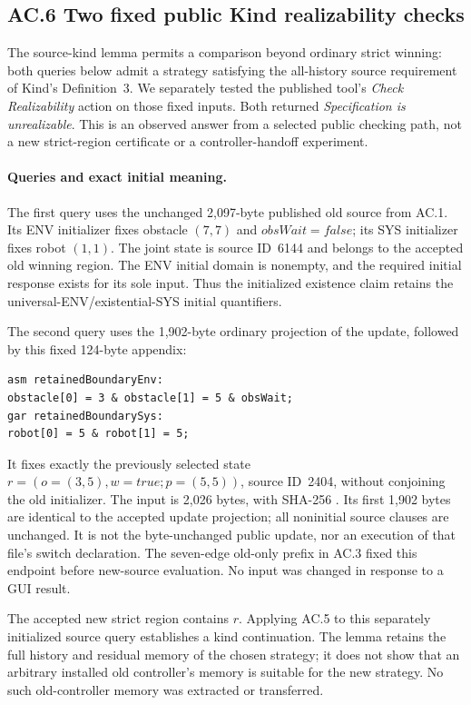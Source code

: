 \clearpage
\subsection*{AC.6 Two fixed public Kind realizability checks}
The source-kind lemma permits a comparison beyond ordinary strict
winning: both queries below admit a strategy satisfying the all-history
source requirement of Kind's Definition~3. We separately tested the
published tool's \emph{Check Realizability} action on those fixed inputs.
Both returned \emph{Specification is unrealizable}. This is an observed
answer from a selected public checking path, not a new strict-region
certificate or a controller-handoff experiment.

\paragraph{Queries and exact initial meaning.}
The first query uses the unchanged 2,097-byte published old source from
AC.1. Its ENV initializer fixes obstacle $(7,7)$ and
$\mathit{obsWait}=\mathit{false}$; its SYS initializer fixes robot $(1,1)$.
The joint state is source ID~6144 and belongs to the accepted old winning
region. The ENV initial domain is nonempty, and the required initial
response exists for its sole input. Thus the initialized existence
claim retains the universal-ENV/existential-SYS initial quantifiers.

The second query uses the 1,902-byte ordinary projection of the update,
followed by this fixed 124-byte appendix:
\begin{lstlisting}
asm retainedBoundaryEnv:
obstacle[0] = 3 & obstacle[1] = 5 & obsWait;
gar retainedBoundarySys:
robot[0] = 5 & robot[1] = 5;
\end{lstlisting}
It fixes exactly the previously selected state
$r=(o=(3,5),w=\mathit{true};p=(5,5))$, source ID~2404, without conjoining
the old initializer. The input is 2,026 bytes, with SHA-256
.
Its first 1,902 bytes are identical to the accepted update projection;
all noninitial source clauses are unchanged. It is not the byte-unchanged
public update, nor an execution of that file's switch declaration.
The seven-edge old-only prefix in AC.3 fixed this endpoint before
new-source evaluation. No input was changed in response to a GUI result.

The accepted new strict region contains $r$. Applying AC.5 to this
separately initialized source query establishes a kind continuation.
The lemma retains the full history and residual memory of the chosen
strategy; it does not show that an arbitrary installed old controller's
memory is suitable for the new strategy. No such old-controller memory
was extracted or transferred.


